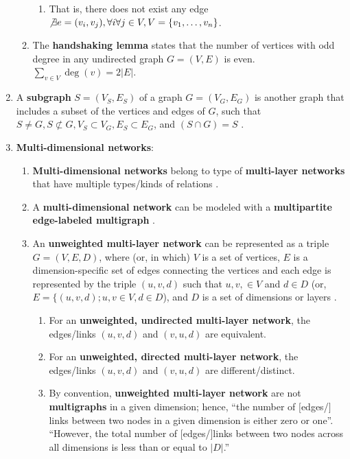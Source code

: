 \begin{enumerate}
\begin{enumerate}
		\begin{enumerate} %
		\item That is, there does not exist any edge $\not\exists e = (v_{i}, v_{j}), \forall i \forall j \in V, V = \{v_{1}, \dots, v_{n}\}$.
		\end{enumerate}
	\item The {\bf handshaking lemma} \cite{WikipediaContributors2018a46,WikipediaContributors2018a37} states that the number of vertices with odd degree in any undirected graph $G = (V, E)$ is even. $\displaystyle\sum_{v \in V} \deg(v) = 2|E|$.
	\end{enumerate}
\item A {\bf subgraph} $S = (V_{S}, E_{S})$ of a graph $G = (V_{G}, E_{G})$ is another graph that includes a subset of the vertices and edges of $G$, such that $S \neq G, S \not\subset G, V_{S} \subset V_{G}, E_{S} \subset E_{G}$, and $(S \cap G) = S$ \cite{WikipediaContributors2018a44}.
\item {\bf Multi-dimensional networks}: \vspace{-0.3cm}
	\begin{enumerate} \itemsep -2pt
	\item {\bf Multi-dimensional networks} belong to type of {\bf multi-layer networks} that have multiple types/kinds of relations \cite{WikipediaContributors2018a42}.
	\item A {\bf multi-dimensional network} can be modeled with a {\bf multipartite edge-labeled multigraph} \cite{WikipediaContributors2018a41,WikipediaContributors2018a42}.
	\item An {\bf unweighted multi-layer network} can be represented as a triple $G = (V, E, D)$, where (or, in which) $V$ is a set of vertices, $E$ is a dimension-specific set of edges connecting the vertices and each edge is represented by the triple $(u, v, d)$ such that $u, v, \in V$ and $d \in D$ (or, $E = \{(u, v, d); u, v \in V, d \in D$), and $D$ is a set of dimensions or layers \cite{WikipediaContributors2018a42}. %
		\begin{enumerate} %
		\item For an {\bf unweighted, undirected multi-layer network}, the edges/links $(u, v, d)$ and $(v, u, d)$ are equivalent.
		\item For an {\bf unweighted, directed multi-layer network}, the edges/links $(u, v, d)$ and $(v, u, d)$ are different/distinct.
		\item By convention, {\bf unweighted multi-layer network} are not {\bf multigraphs} in a given dimension; hence, ``the number of $[$edges/$]$links between two nodes in a given dimension is either zero or one''. ``However, the total number of $[$edges/$]$links between two nodes across all dimensions is less than or equal to $| D |$.''

\end{enumerate}
\end{enumerate}
\end{enumerate}
